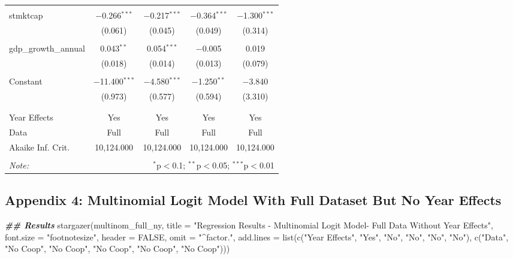 \documentclass[a4paper,nobind]{templates/ociamthesis}
\newenvironment{Shaded}{\begin{snugshade}}{\end{snugshade}}
\newcommand{\AttributeTok}[1]{\textcolor[rgb]{0.77,0.63,0.00}{#1}}
\newcommand{\ConstantTok}[1]{\textcolor[rgb]{0.00,0.00,0.00}{#1}}
\newcommand{\DocumentationTok}[1]{\textcolor[rgb]{0.56,0.35,0.01}{\textbf{\textit{#1}}}}
\newcommand{\FunctionTok}[1]{\textcolor[rgb]{0.00,0.00,0.00}{#1}}
\newcommand{\NormalTok}[1]{#1}
\newcommand{\StringTok}[1]{\textcolor[rgb]{0.31,0.60,0.02}{#1}}
\renewenvironment{Shaded}
{
  \vspace{10pt}%
  \begin{snugshade}%
}{%
  \end{snugshade}%
  \vspace{8pt}%
}
\begin{document}
\begin{table}[!htbp]
\begin{tabular}{@{\extracolsep{5pt}}lcccc}
  & & & & \\ 
 stmktcap & $-$0.266$^{***}$ & $-$0.217$^{***}$ & $-$0.364$^{***}$ & $-$1.300$^{***}$ \\ 
  & (0.061) & (0.045) & (0.049) & (0.314) \\ 
  & & & & \\ 
 gdp\_growth\_annual & 0.043$^{**}$ & 0.054$^{***}$ & $-$0.005 & 0.019 \\ 
  & (0.018) & (0.014) & (0.013) & (0.079) \\ 
  & & & & \\ 
 Constant & $-$11.400$^{***}$ & $-$4.580$^{***}$ & $-$1.250$^{**}$ & $-$3.840 \\ 
  & (0.973) & (0.577) & (0.594) & (3.310) \\ 
  & & & & \\ 
\hline \\[-1.8ex] 
Year Effects & Yes & Yes & Yes & Yes \\ 
Data & Full & Full & Full & Full \\ 
Akaike Inf. Crit. & 10,124.000 & 10,124.000 & 10,124.000 & 10,124.000 \\ 
\hline 
\hline \\[-1.8ex] 
\textit{Note:}  & \multicolumn{4}{r}{$^{*}$p$<$0.1; $^{**}$p$<$0.05; $^{***}$p$<$0.01} \\ 
\end{tabular} 
\end{table}

\newpage

\hypertarget{appendix-4-multinomial-logit-model-with-full-dataset-but-no-year-effects}{%
\subsection{Appendix 4: Multinomial Logit Model With Full Dataset But No Year Effects}\label{appendix-4-multinomial-logit-model-with-full-dataset-but-no-year-effects}}

\begin{Shaded}
\begin{Highlighting}[]
\DocumentationTok{\#\# Results }
\FunctionTok{stargazer}\NormalTok{(multinom\_full\_ny, }\AttributeTok{title =} \StringTok{"Regression Results {-} Multinomial Logit Model{-} Full Data Without Year Effects"}\NormalTok{, }\AttributeTok{font.size =} \StringTok{"footnotesize"}\NormalTok{, }\AttributeTok{header =} \ConstantTok{FALSE}\NormalTok{, }\AttributeTok{omit =} \StringTok{"\^{}factor."}\NormalTok{, }\AttributeTok{add.lines =} \FunctionTok{list}\NormalTok{(}\FunctionTok{c}\NormalTok{(}\StringTok{"Year Effects"}\NormalTok{, }\StringTok{"Yes"}\NormalTok{, }\StringTok{"No"}\NormalTok{, }\StringTok{"No"}\NormalTok{, }\StringTok{"No"}\NormalTok{, }\StringTok{"No"}\NormalTok{), }\FunctionTok{c}\NormalTok{(}\StringTok{"Data"}\NormalTok{, }\StringTok{"No Coop"}\NormalTok{, }\StringTok{"No Coop"}\NormalTok{, }\StringTok{"No Coop"}\NormalTok{, }\StringTok{"No Coop"}\NormalTok{, }\StringTok{"No Coop"}\NormalTok{)))}
\end{Highlighting}
\end{Shaded}
\end{document}
